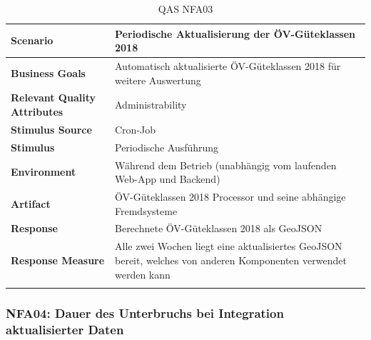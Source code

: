 \begin{longtable}{l p{10.6cm}}
        \toprule
        \textbf{Scenario}
                                & Periodische Aktualisierung der ÖV-Güteklassen 2018\\
        \midrule
        \textbf{Business Goals}
                                & Automatisch aktualisierte ÖV-Güteklassen 2018 für weitere Auswertung\\
        \textbf{Relevant Quality Attributes}
                                & Administrability\\
        \textbf{Stimulus Source}
                                & Cron-Job\\
        \textbf{Stimulus}
                                & Periodische Ausführung \nameref{Use Cases:UC01} \\
        \textbf{Environment}
                                & Während dem Betrieb (unabhängig vom laufenden Web-App und Backend)\\
        \textbf{Artifact}
                                & ÖV-Güteklassen 2018 Processor und seine abhängige Fremdsysteme\\
        \textbf{Response}
                                & Berechnete ÖV-Güteklassen 2018 als GeoJSON\\  
        \textbf{Response Measure}
                                & Alle zwei Wochen liegt eine aktualisiertes GeoJSON bereit, welches von anderen Komponenten verwendet werden kann\\                                
        \bottomrule
    \caption{QAS NFA03}
    \label{table:nfa03}
\end{longtable}

\subsubsection{NFA04: Dauer des Unterbruchs bei Integration aktualisierter Daten}
\label{NFA:NFA04}

